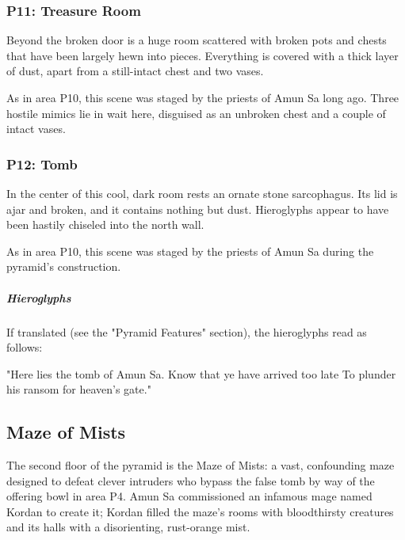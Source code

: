 \documentclass[10pt,a4paper,twoside,bg=print,twocolumn,openany,nodeprecatedcode]{dndbook}
\begin{document}
\subsubsection{P11: Treasure Room}
\begin{DndReadAloud}{}
Beyond the broken door is a huge room scattered with broken pots and chests that have been largely hewn into pieces. Everything is covered with a thick layer of dust, apart from a still-intact chest and two vases.

\end{DndReadAloud}

As in area P10, this scene was staged by the priests of Amun Sa long ago. Three hostile mimics lie in wait here, disguised as an unbroken chest and a couple of intact vases.

\subsubsection{P12: Tomb}
\begin{DndReadAloud}{}
In the center of this cool, dark room rests an ornate stone sarcophagus. Its lid is ajar and broken, and it contains nothing but dust. Hieroglyphs appear to have been hastily chiseled into the north wall.

\end{DndReadAloud}

As in area P10, this scene was staged by the priests of Amun Sa during the pyramid's construction.

\subparagraph{Hieroglyphs}
If translated (see the "Pyramid Features" section), the hieroglyphs read as follows:

\begin{DndReadAloud}{}
"Here lies the tomb of Amun Sa. Know that ye have arrived too late To plunder his ransom for heaven's gate."

\end{DndReadAloud}

\subsection{Maze of Mists}
The second floor of the pyramid is the Maze of Mists: a vast, confounding maze designed to defeat clever intruders who bypass the false tomb by way of the offering bowl in area P4. Amun Sa commissioned an infamous mage named Kordan to create it; Kordan filled the maze's rooms with bloodthirsty creatures and its halls with a disorienting, rust-orange mist.
\end{document}
